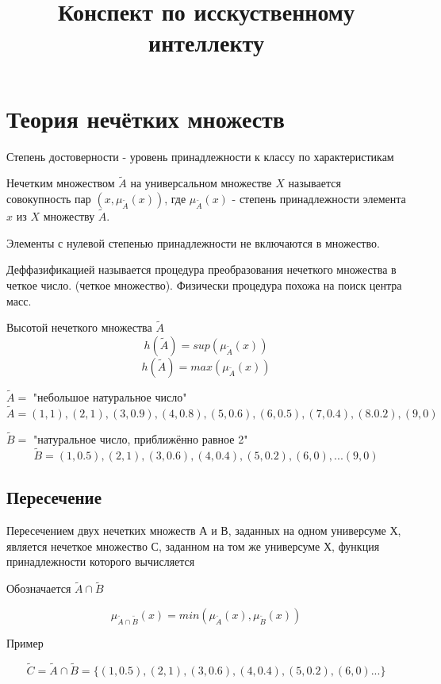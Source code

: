 
\usepackage[utf8]{inputenc}
\title{Конспект по исскуственному интеллекту}


    \maketitle
    \clearpage
    \tableofcontents    
    \clearpage
    
    \section{Теория нечётких множеств}
        Степень достоверности - уровень принадлежности к классу по характеристикам
		
		Нечетким множеством $\tilde A$ на универсальном множестве $X$ называется совокупность пар
		$(x, \mu_{\tilde A}(x))$, где $\mu_{\tilde A}(x)$
		- степень принадлежности элемента $x$ из
		$X$ множеству $\widetilde{A}$.
		
		Элементы с нулевой степенью принадлежности не включаются в множество.
		
		Деффазификацией называется процедура преобразования нечеткого множества в четкое число.
		(четкое множество). Физически процедура похожа на поиск центра масс. 
		
		Высотой нечеткого множества $\tilde A$ 
		\[h(\tilde A) = sup(\mu_{\tilde A}(x))\]
		\[h(\tilde A) = max(\mu_{\tilde A}(x))\]
		
        $\tilde A =$ "небольшое натуральное число"
		\[\tilde A = {(1, 1), (2, 1), (3, 0.9), (4, 0.8), (5, 0.6), (6, 0.5), (7, 0.4), (8. 0.2), (9, 0)}\]
		
		$\tilde B =$ "натуральное число, приближённо равное 2"
		\[\tilde B = {(1, 0.5), (2, 1), (3, 0.6), (4, 0.4), (5, 0.2), (6, 0), ... (9, 0)}\]
		
		\subsection{Пересечение}
    			Пересечением двух нечетких множеств А и В, заданных на одном универсуме Х, является 
			нечеткое множество С, заданном на том же универсуме Х, функция принадлежности которого
			вычисляется
			
			Обозначается $\tilde A \cap \tilde B$
			
			\[\mu_{\tilde A \cap \tilde B}(x) = min(\mu_{\tilde A}(x), \mu_{\tilde B}(x))\]
			
			Пример
			
				\[\tilde C = \tilde A \cap \tilde B = \{(1, 0.5), (2, 1), (3, 0.6), (4, 0.4), (5, 0.2), (6, 0) ...\}\]
				

